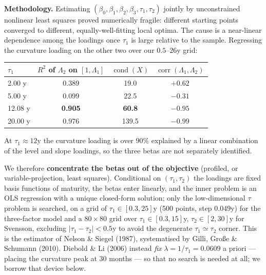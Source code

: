\documentclass[11pt]{article}
\begin{document}
\textbf{Methodology.} Estimating $(\beta_0,\beta_1,\beta_2,\beta_3,\tau_1,\tau_2)$ jointly by
unconstrained nonlinear least squares proved numerically fragile: different starting points converged
to different, equally-well-fitting local optima. The cause is a near-linear dependence among the
loadings once $\tau_1$ is large relative to the sample. Regressing the curvature loading on the other
two over our $0.5$--$26$y grid:
 
\begin{center}
\begin{tabular}{lccc}
\toprule
$\tau_1$ & $R^2$ of $\Lambda_2$ on $[1,\Lambda_1]$ & $\operatorname{cond}(X)$ & $\operatorname{corr}(\Lambda_1,\Lambda_2)$ \\
\midrule
 2.00 y & 0.389 & 19.0 & $+0.62$ \\
  5.00 y & 0.099 & 22.5 & $-0.31$ \\
12.08 y & \textbf{0.905} & \textbf{60.8} & $\mathbf{-0.95}$ \\
20.00 y & 0.976 & 139.5 & $-0.99$ \\
\bottomrule
\end{tabular}
\end{center}
 
\noindent At $\tau_1\approx12$y the curvature loading is over $90\%$ explained by a linear combination
of the level and slope loadings, so the three betas are not separately identified.
 
We therefore \textbf{concentrate the betas out of the objective} (profiled, or variable-projection,
least squares). Conditional on $(\tau_1,\tau_2)$ the loadings are fixed basis functions of maturity,
the betas enter linearly, and the inner problem is an OLS regression with a unique closed-form
solution; only the low-dimensional $\tau$ problem is searched, on a grid of
$\tau_1\in[0.3,25]$y (500 points, step $0.049$y) for the three-factor model
and a $80\times80$ grid over $\tau_1\in[0.3,15]$y, $\tau_2\in[2,30]$y for Svensson, excluding
$|\tau_1-\tau_2|<0.5$y to avoid the degenerate $\tau_1\simeq\tau_2$ corner. This is the estimator of Nelson \&
Siegel (1987), systematised by Gilli, Gro\ss e \& Schumann (2010). Diebold \& Li (2006) instead
\emph{fix} $\lambda=1/\tau_1=0.0609$ a priori --- placing the curvature peak at 30 months --- so that
no search is needed at all; we borrow that device below.
 
\end{document}
